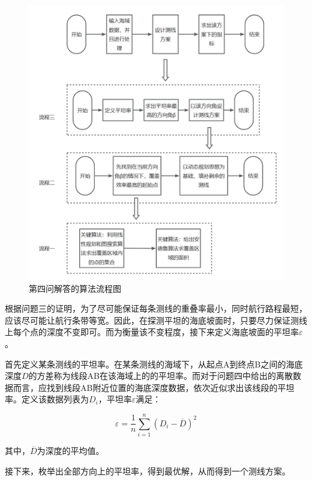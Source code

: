 \begin{figure}[h]
    \centering
    \includegraphics[scale=0.3]{res/img/第四问解答的算法流程图.png}
    \caption[short]{第四问解答的算法流程图}
\end{figure}


根据问题三的证明，为了尽可能保证每条测线的重叠率最小，同时航行路程最短，应该尽可能让航行条带等宽。因此，在探测平坦的海底坡面时，只要尽力保证测线上每个点的深度不变即可。而为衡量该不变程度，接下来定义海底坡面的平坦率$\varepsilon$。

首先定义某条测线的平坦率。在某条测线的海域下，从起点A到终点B之间的海底深度$D$的方差称为线段AB在该海域上的的平坦率。而对于问题四中给出的离散数据而言，应找到线段AB附近位置的海底深度数据，依次近似求出该线段的平坦率。定义该数据列表为$D_{i}$，平坦率$\varepsilon$满足：

\begin{equation}
    \varepsilon = \frac{1}{n} \sum^{n}_{i=1}(D_i - \overline{D} )^2
\end{equation}

其中，$\overline{D}$为深度的平均值。

接下来，枚举出全部方向上的平坦率，得到最优解，从而得到一个测线方案。

